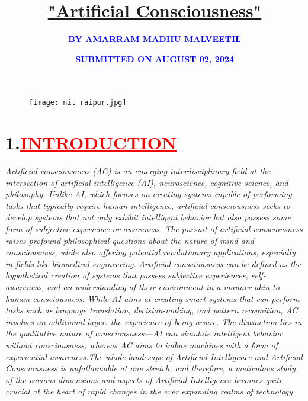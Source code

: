 \documentclass[12pt]{article}
\title{\textbf{\textcolor{PineGreen}{\underline{"Artificial Consciousness"}}}}
\author{\textbf{\textcolor{Blue}{BY AMARRAM MADHU MALVEETIL}}}
\affil[]{\textcolor{Blue}{\textbf{ROLL NO.:21111009}}}
\affil[]{\textbf{\textcolor{Brown}{"Department of BIOMEDICAL ENGINEERING"}}}
\affil[]{\textbf{\textcolor{RedViolet}{"NATIONAL INSTITUTE OF TECHNOLOGY, RAIPUR", CHATTISGARH"}}}
\affil[]{\textbf{\textcolor{Blue}{BATCH:2026\hspace{2cm}SEMESTER:V}}}
\affil[]{\textbf{\textcolor{Maroon}{Assignment 4 of"ARTIFICIAL INTELLIGENCE"}}}
\date{\textbf{\textcolor{Blue}{SUBMITTED ON AUGUST 02, 2024}}}
\begin{document}
\begin{figure}
    \centering
    \texttt{[image: nit raipur.jpg]}
\end{figure}
\maketitle
\newpage
\section*{\textbf{1.\hspace{1cm}\textcolor{red}{\underline{\huge{INTRODUCTION}}}}}
\hspace{1cm}\large{\emph{Artificial consciousness (AC) is an emerging interdisciplinary field at the intersection of artificial intelligence (AI), neuroscience, cognitive science, and philosophy. Unlike AI, which focuses on creating systems capable of performing tasks that typically require human intelligence, artificial consciousness seeks to develop systems that not only exhibit intelligent behavior but also possess some form of subjective experience or awareness. The pursuit of artificial consciousness raises profound philosophical questions about the nature of mind and consciousness, while also offering potential revolutionary applications, especially in fields like biomedical engineering.\vspace{1cm}\newline}} 
\hspace{1cm}\large{\emph{Artificial consciousness can be defined as the hypothetical creation of systems that possess subjective experiences, self-awareness, and an understanding of their environment in a manner akin to human consciousness. While AI aims at creating smart systems that can perform tasks such as language translation, decision-making, and pattern recognition, AC involves an additional layer: the experience of being aware. The distinction lies in the qualitative nature of consciousness—AI can simulate intelligent behavior without consciousness, whereas AC aims to imbue machines with a form of experiential awareness.The whole landcsape of Artificial Intelligence and Artificial Consciousness is unfathomable at one stretch, and therefore, a meticulous study of the various dimensions and aspects of Artificial Intelligence becomes quite crucial at the heart of rapid changes in the ever expanding realms of technology. }}
\newpage
\end{document}
